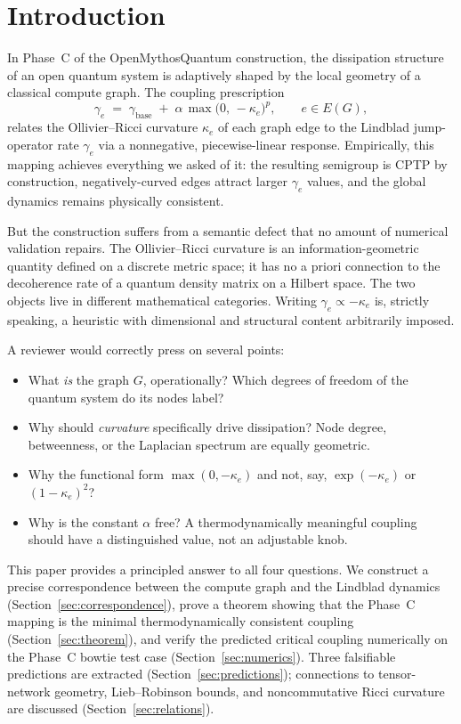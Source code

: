 \documentclass[11pt,letterpaper]{article}
\theoremstyle{definition}
\theoremstyle{remark}
\begin{document}
\section{Introduction}
\label{sec:intro}

In Phase~C of the OpenMythosQuantum construction, the dissipation structure of
an open quantum system is adaptively shaped by the local geometry of a
classical compute graph. The coupling prescription
\begin{equation}
\gamma_e \;=\; \gamma_{\mathrm{base}}
\;+\; \alpha\,\max\!\big(0,\, -\kappa_e\big)^{p},
\qquad e \in E(G),
\label{eq:phase_c_mapping}
\end{equation}
relates the Ollivier--Ricci curvature $\kappa_e$ of each graph edge to the
Lindblad jump-operator rate $\gamma_e$ via a nonnegative, piecewise-linear
response.
Empirically, this mapping achieves everything we asked of it: the resulting
semigroup is CPTP by construction, negatively-curved edges attract larger
$\gamma_e$ values, and the global dynamics remains physically consistent.

But the construction suffers from a semantic defect that no amount of
numerical validation repairs. The Ollivier--Ricci curvature
\cite{Ollivier2009,LinLuYau2011} is an information-geometric quantity
defined on a discrete metric space; it has no a priori connection to the
decoherence rate of a quantum density matrix on a Hilbert space. The two
objects live in different mathematical categories. Writing
$\gamma_e \propto -\kappa_e$ is, strictly speaking, a heuristic with
dimensional and structural content arbitrarily imposed.

A reviewer would correctly press on several points:
\begin{itemize}[leftmargin=1.4em,itemsep=2pt,topsep=2pt]
\item What \emph{is} the graph $G$, operationally? Which degrees of freedom
   of the quantum system do its nodes label?
\item Why should \emph{curvature} specifically drive dissipation? Node
   degree, betweenness, or the Laplacian spectrum are equally geometric.
\item Why the functional form $\max(0,-\kappa_e)$ and not, say,
   $\exp(-\kappa_e)$ or $(1-\kappa_e)^2$?
\item Why is the constant $\alpha$ free? A thermodynamically meaningful
   coupling should have a distinguished value, not an adjustable knob.
\end{itemize}
This paper provides a principled answer to all four questions. We construct a
precise correspondence between the compute graph and the Lindblad dynamics
(Section~\ref{sec:correspondence}), prove a theorem showing that the
Phase~C mapping is the minimal thermodynamically consistent coupling
(Section~\ref{sec:theorem}), and verify the predicted critical coupling
numerically on the Phase~C bowtie test case (Section~\ref{sec:numerics}).
Three falsifiable predictions are extracted
(Section~\ref{sec:predictions}); connections to tensor-network geometry,
Lieb--Robinson bounds, and noncommutative Ricci curvature are discussed
(Section~\ref{sec:relations}).
\end{document}

